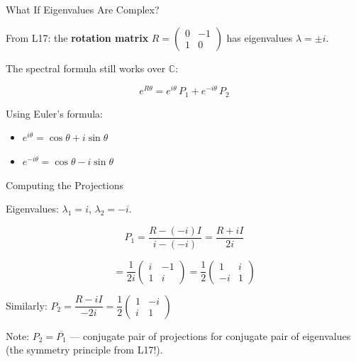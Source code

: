 \documentclass[10pt]{beamer}
\theoremstyle{definition}
\newcommand{\x}[1]{\alert{\textbf{#1}}}
\begin{document}
\begin{frame}{What If Eigenvalues Are Complex?}

From L17: the \x{rotation matrix} $R = \begin{pmatrix}0&-1\\1&0\end{pmatrix}$ has eigenvalues $\lambda = \pm i$.

\vfill\pause

The spectral formula still works over $\mathbb{C}$:

$$e^{R\theta} = e^{i\theta}\,P_1 + e^{-i\theta}\,P_2$$

\vfill\pause

Using Euler's formula:
\begin{itemize}
\item $e^{i\theta} = \cos\theta + i\sin\theta$
\item $e^{-i\theta} = \cos\theta - i\sin\theta$
\end{itemize}

\end{frame}


\begin{frame}{Computing the Projections}

Eigenvalues: $\lambda_1 = i$, $\lambda_2 = -i$.

\vfill

$$P_1 = \frac{R - (-i)I}{i - (-i)} = \frac{R + iI}{2i}$$

\vfill\pause

$$= \frac{1}{2i}\begin{pmatrix}i & -1 \\ 1 & i\end{pmatrix} = \frac{1}{2}\begin{pmatrix}1 & i \\ -i & 1\end{pmatrix}$$

\vfill\pause

Similarly: $P_2 = \dfrac{R - iI}{-2i} = \dfrac{1}{2}\begin{pmatrix}1 & -i \\ i & 1\end{pmatrix}$

\vfill

Note: $P_2 = \overline{P_1}$ --- conjugate pair of projections for conjugate pair of eigenvalues (the symmetry principle from L17!).

\end{frame}
\end{document}
